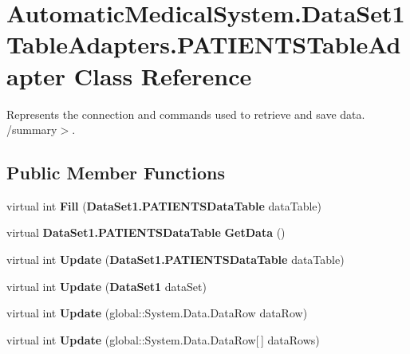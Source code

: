 \section{AutomaticMedicalSystem.DataSet1TableAdapters.PATIENTSTableAdapter Class Reference}
\label{class_automatic_medical_system_1_1_data_set1_table_adapters_1_1_p_a_t_i_e_n_t_s_table_adapter}
Represents the connection and commands used to retrieve and save data. /summary$>$.  


\subsection*{Public Member Functions}
\begin{CompactItemize}
\item 
virtual int \textbf{Fill} ({\bf DataSet1.PATIENTSDataTable} dataTable)\label{class_automatic_medical_system_1_1_data_set1_table_adapters_1_1_p_a_t_i_e_n_t_s_table_adapter_9121b7c5c7e3160919a44bdb8c6c2d73}

\item 
virtual {\bf DataSet1.PATIENTSDataTable} \textbf{GetData} ()\label{class_automatic_medical_system_1_1_data_set1_table_adapters_1_1_p_a_t_i_e_n_t_s_table_adapter_8932125716e6160907e96123cf610351}

\item 
virtual int \textbf{Update} ({\bf DataSet1.PATIENTSDataTable} dataTable)\label{class_automatic_medical_system_1_1_data_set1_table_adapters_1_1_p_a_t_i_e_n_t_s_table_adapter_d46e266726fdff8f8e08b0ebd0f83d95}

\item 
virtual int \textbf{Update} ({\bf DataSet1} dataSet)\label{class_automatic_medical_system_1_1_data_set1_table_adapters_1_1_p_a_t_i_e_n_t_s_table_adapter_a3515b5c225bdf6ef0f510531dde8985}

\item 
virtual int \textbf{Update} (global::System.Data.DataRow dataRow)\label{class_automatic_medical_system_1_1_data_set1_table_adapters_1_1_p_a_t_i_e_n_t_s_table_adapter_d15bba65d09076adea4bb69478ace5ff}

\item 
virtual int \textbf{Update} (global::System.Data.DataRow[$\,$] dataRows)\label{class_automatic_medical_system_1_1_data_set1_table_adapters_1_1_p_a_t_i_e_n_t_s_table_adapter_ba9e8851e97c8ef6aae203e961ae17ec}


\end{CompactItemize}
